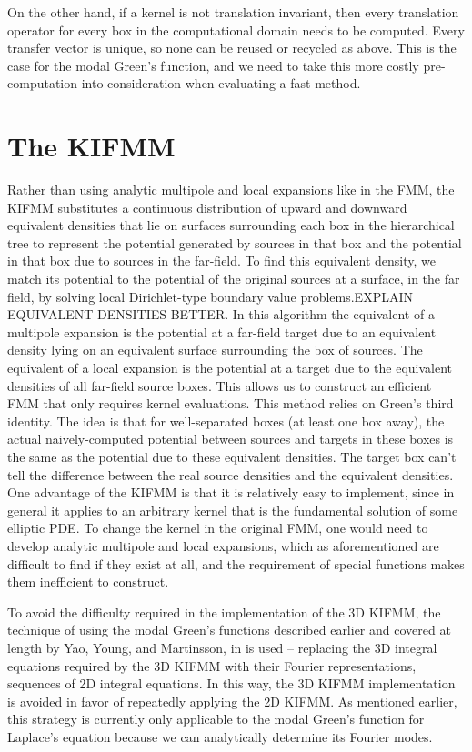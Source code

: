 \documentclass[11pt, oneside]{article}   	%
\begin{document}
On the other hand, if a kernel is not translation invariant, then every translation operator for every box in the computational domain needs to be computed. Every transfer vector is unique, so none can be reused or recycled as above. This is the case for the modal Green's function, and we need to take this more costly pre-computation into consideration when evaluating a fast method.

\section{The KIFMM}
Rather than using analytic multipole and local expansions like in the FMM, the KIFMM substitutes a continuous distribution of upward and downward equivalent densities that lie on surfaces surrounding each box in the hierarchical tree to represent the potential generated by sources in that box and the potential in that box due to sources in the far-field. To find this equivalent density, we match its potential to the potential of the original sources at a surface, in the far field, by solving local Dirichlet-type boundary value problems.EXPLAIN EQUIVALENT DENSITIES BETTER. In this algorithm the equivalent of a multipole expansion is the potential at a far-field target due to an equivalent density lying on an equivalent surface surrounding the box of sources. The equivalent of a local expansion is the potential at a target due to the equivalent densities of all far-field source boxes. This allows us to construct an efficient FMM that only requires kernel evaluations. This method relies on Green's third identity. The idea is that for well-separated boxes (at least one box away), the actual naively-computed potential between sources and targets in these boxes is the same as the potential due to these equivalent densities. The target box can't tell the difference between the real source densities and the equivalent densities. One advantage of the KIFMM is that it is relatively easy to implement, since in general it applies to an arbitrary kernel that is the fundamental solution of some elliptic PDE. To change the kernel in the original FMM, one would need to develop analytic multipole and local expansions, which as aforementioned are difficult to find if they exist at all, and the requirement of special functions makes them inefficient to construct.

To avoid the difficulty required in the implementation of the 3D KIFMM, the technique of using the modal Green's functions described earlier and covered at length by Yao, Young, and Martinsson, in \cite{YYM} is used -- replacing the 3D integral equations required by the 3D KIFMM with their Fourier representations, sequences of 2D integral equations. In this way, the 3D KIFMM implementation is avoided in favor of repeatedly applying the 2D KIFMM. As mentioned earlier, this strategy is currently only applicable to the modal Green's function for Laplace's equation because we can analytically determine its Fourier modes.
\end{document}
